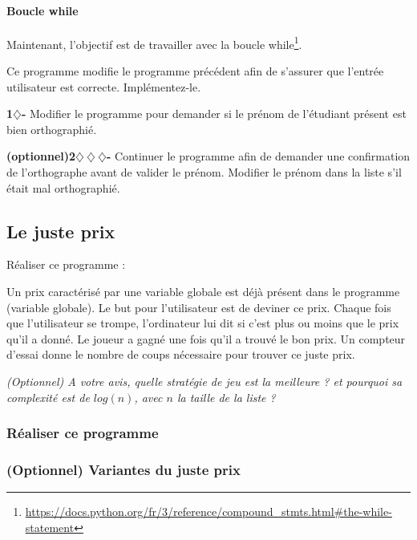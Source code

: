 \paragraph{Boucle while}
Maintenant, l'objectif est de travailler avec la boucle while\footnote{ \url{https://docs.python.org/fr/3/reference/compound_stmts.html\#the-while-statement}}.

Ce programme modifie le programme précédent afin de s'assurer que l'entrée utilisateur est correcte.
Implémentez-le.


\begin{tcolorbox}[lefttitle=2cm, colframe=gray!75!black, title= \textbf{Exercices}]

\textbf{1$\diamondsuit$-}
Modifier le programme pour demander si le prénom de l'étudiant présent est bien orthographié.

\textbf{(optionnel)2$\diamondsuit~\diamondsuit~\diamondsuit$-}
Continuer le programme afin de demander une confirmation de l'orthographe avant de valider le prénom.
Modifier le prénom dans la liste s'il était mal orthographié.

\end{tcolorbox}


\subsection{Le juste prix}
Réaliser ce programme :

Un prix caractérisé par une variable globale est déjà présent dans le programme (variable globale). Le but pour l’utilisateur est de deviner ce prix. Chaque fois que l’utilisateur se trompe, l’ordinateur lui dit si c’est plus ou moins que le prix qu’il a donné. Le joueur a gagné une fois qu'il a trouvé le bon prix. Un compteur d'essai donne le nombre de coups nécessaire pour trouver ce juste prix.

\textit{(Optionnel) A votre avis, quelle stratégie de jeu est la meilleure ? et pourquoi sa complexité est de $log (n)$, avec $n$ la taille de la liste ?}


\subsubsection{Réaliser ce programme}

\subsubsection{(Optionnel) Variantes du juste prix}
